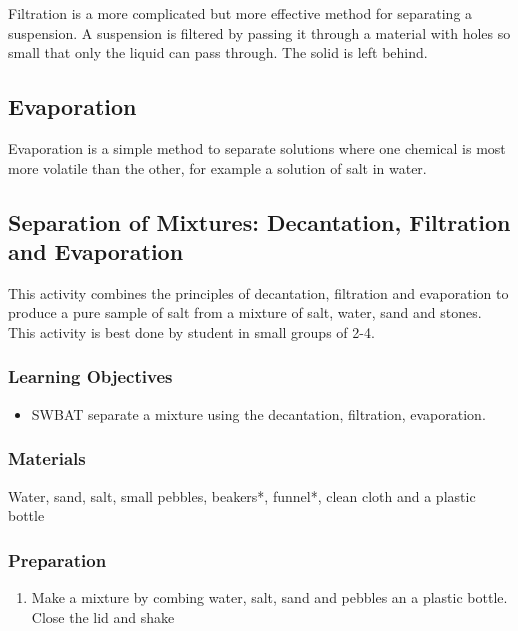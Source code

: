 Filtration is a more complicated but more effective method for separating a suspension. A suspension is filtered by passing it through a material with holes so small that only the liquid can pass through. The solid is left behind.

\subsection{Evaporation}

Evaporation is a simple method to separate solutions where one chemical is most more volatile than the other, for example a solution of salt in water.

\subsection{Separation of Mixtures: Decantation, Filtration and Evaporation}
This activity combines the principles of decantation, filtration and evaporation to produce a pure sample of salt from a mixture of salt, water, sand and stones. This activity is best done by student in small groups of 2-4.

\subsubsection*{Learning Objectives}
\begin{itemize}
\item{SWBAT separate  a mixture using the decantation, filtration, evaporation.}
\end{itemize}

\subsubsection*{Materials}
Water, sand, salt, small pebbles, beakers*, funnel*, clean cloth and a plastic bottle
\subsubsection*{Preparation}
\begin{enumerate}
\item{Make a mixture by combing water, salt, sand and pebbles an a plastic bottle. Close the lid and shake}
\end{enumerate}
